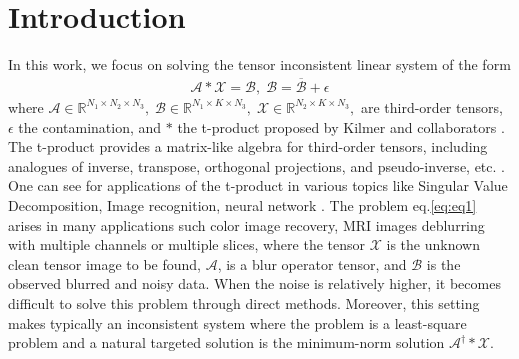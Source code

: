 \documentclass[11pt]{article}
\def\fm#1{\mathcal{#1}}
\newcommand{\comment}[1]{}
\begin{document}

\section{Introduction}
In this work, we focus on solving the tensor inconsistent  linear system  of the form 
\begin{align}
\label{eq:eq1}
\mathcal{A} * \mathcal{X} =  \mathcal{B},\;  \fm B = \overline{\fm B} + \epsilon
\end{align}
where $\mathcal{A}\in\mathbb{R}^{N_1\times N_2\times N_3},\;
\mathcal{B}\in\mathbb{R}^{N_1\times K\times N_3},\;
\mathcal{X}\in\mathbb{R}^{N_2\times K\times N_3},$  are third-order tensors, $\epsilon$ the contamination,  and $*$ the t-product proposed by Kilmer and collaborators  \cite{kilmer2011facto, kilmer2013thirdOrder}. The t-product \comment{for tensors} provides a matrix-like algebra for third-order tensors, including analogues of inverse, transpose, orthogonal projections, and  pseudo-inverse, etc. \cite{kilmer2011facto, kilmer2013thirdOrder}. One can see \cite{zhang2018, qi2021, Wang2020} for applications of the t-product in various topics like Singular Value Decomposition, Image recognition, neural network \cite{wang2020}. The problem eq.\eqref{eq:eq1} arises in many applications such color image recovery,  MRI images deblurring with multiple channels or multiple slices, where the tensor  $\fm X$ is the unknown clean tensor image to be found, $\fm A$, is a blur operator tensor, and $\fm B$ is the observed blurred and noisy data. When the noise is relatively higher, it becomes difficult to solve this problem  through direct methods. Moreover, this setting makes typically an inconsistent system  where the problem is a least-square problem and a natural targeted solution is the minimum-norm  solution $\fm A^\dagger * \fm X$. \comment{ in the t-product sense. }
\end{document}
